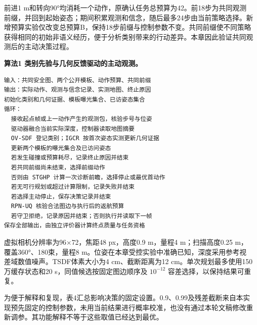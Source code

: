 \documentclass[11pt,a4paper]{article}
\numberwithin{equation}{section}
\begin{document}
前进1 m和转向90°均消耗一个动作，原确认任务总预算为42。前18步为共同观测前缀，并回到起始姿态；期间积累观测和信念，随后最多24步由当前策略选择。新增预算实验仅改变总预算B，保持18步前缀与控制参数不变。共同前缀使不同策略获得相同的初始非语义经历，便于分析类别带来的行动差异。本章因此验证共同观测后的主动决策过程。

\par\noindent\begin{minipage}{\linewidth}
\small
\textbf{算法1 类别先验与几何反馈驱动的主动观测。}

\begin{verbatim}
输入：共同安全图、两个公开模板、动作预算、共同前缀
输出：实际动作、观测与信念记录、实测地图、终止原因
初始化类别和几何证据、模板曝光集合、已访姿态集合
循环：
  接收起点帧或上一动作产生的观测包，核验步号与位姿
  驱动器融合当前实际深度，控制器读取地图摘要
  OV-SDF 登记类别；IGCR 按首次姿态实测更新几何证据
  更新两个模板的曝光集合及已访问姿态
  若发生碰撞或预算耗尽，记录终止原因并结束
  若共同前缀尚未结束，选择前缀动作
  否则由 STGHP 计算一次诊断前瞻，选择停止或最优首动作
  若无可行规划或超过计算限制，记录失败并结束
  若选择主动停止，保存决策记录并结束
  RPN-UQ 核验合法图边与执行后的返航预算
  若守卫拒绝，记录原因并结束；否则执行并读取下一帧
保存全部输出，由独立评价器计算终点质量与任务资格
\end{verbatim}
\end{minipage}


虚拟相机分辨率为96×72，焦距48 px，高度0.9 m，量程4 m；扫描高度0.25 m，覆盖360°、180束，量程8 m。位姿在本章受控实验中准确已知，深度采用参考视差域数值噪声。TSDF体素大小为4 cm、截断距离为12 cm。单次规划最多使用150万缓存状态和20 s，同值候选按固定图边顺序及 \(10^{-12}\) 容差选择，以保持结果可重复。

为便于解释和复现，表4汇总影响决策的固定设置。0.9、0.99及残差截断来自本实现预先固定的控制参数，未用当前结果进行概率校准，也没有通过本轮文稿修改重新调参。其功能解释不等于这些取值已经达到最优。
\end{document}
